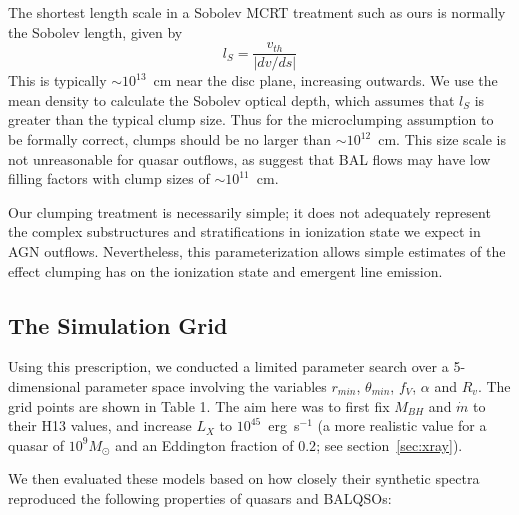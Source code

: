 \documentclass[useAMS,usenatbib]{mn2e_x}
\begin{document}
The shortest length scale in a Sobolev MCRT treatment such as ours 
is normally the Sobolev length, given by
\begin{equation}
l_S = \frac{v_{th}}{| dv/ds |}
\end{equation}
This is typically $\sim10^{13}$~cm near the disc plane, increasing outwards.
We use the mean density to calculate the Sobolev optical depth, which assumes that
$l_S$ is greater than the typical clump size.
Thus for the microclumping assumption to be formally correct, 
clumps should be no larger than $\sim10^{12}$~cm.
This size scale is not unreasonable for quasar outflows, as
\cite{dekool1995} suggest that BAL flows may have low filling factors with
clump sizes of $\sim10^{11}$~cm.

Our clumping treatment is necessarily simple; it does not adequately
represent the complex substructures and stratifications in ionization
state we expect in AGN outflows. 
Nevertheless, this parameterization 
allows simple estimates of the effect clumping has on the ionization 
state and emergent line emission.

\subsection{The Simulation Grid}

Using this prescription, we conducted a limited parameter
search over a 5-dimensional parameter space involving the 
variables $r_{min}$, $\theta_{min}$, $f_V$, $\alpha$ and $R_v$.
The grid points are shown in Table 1.
The aim here was to first fix $M_{BH}$ and $\dot{m}$ to their H13 values,
and increase $L_X$ to $10^{45}$~erg~s$^{-1}$ (a more realistic value for a 
quasar of $10^9M_\odot$ and an Eddington fraction of $0.2$; see section~\ref{sec:xray}).

We then evaluated these models based on 
how closely their synthetic spectra reproduced the 
following properties of quasars and BALQSOs:
\end{document}
